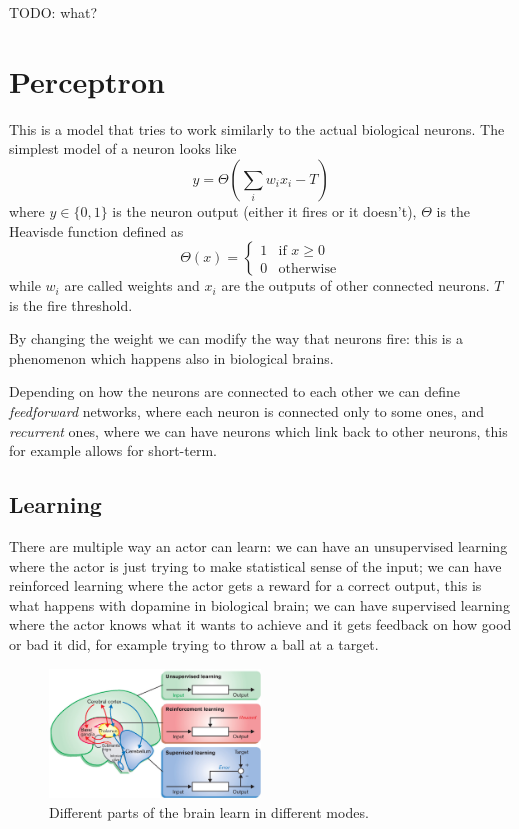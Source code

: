 \documentclass[12pt]{extarticle}
\begin{document}
TODO: what?

\section{Perceptron}

This is a model that tries to work similarly to the actual biological neurons.
The simplest model of a neuron looks like
\begin{equation}
	y = \Theta \left(\sum_i w_i x_i - T \right)
\end{equation}
where $y \in \{0, 1\}$ is the neuron output (either it fires or it doesn't),
$\Theta$ is the Heavisde function defined as
\begin{equation}
	\Theta(x) = \begin{cases}
		1 & \text{if } x \geq 0 \\
		0 & \text{otherwise}
	\end{cases}
\end{equation}
while $w_i$ are called weights and $x_i$ are the outputs of other connected neurons.
$T$ is the fire threshold.

By changing the weight we can modify the way that neurons fire: this is a phenomenon which happens
also in biological brains.

Depending on how the neurons are connected to each other we can define \emph{feedforward}
networks, where each neuron is connected only to some  ones, and \emph{recurrent} ones,
where we can have neurons which link back to other neurons, this for example allows for short-term.

\subsection{Learning}

There are multiple way an actor can learn: we can have an unsupervised learning where the actor
is just trying to make statistical sense of the input;
we can have reinforced learning where the actor gets a reward for a correct output, this is what
happens with dopamine in biological brain;
we can have supervised learning where the actor knows what it wants to achieve and it gets feedback
on how good or bad it did, for example trying to throw a ball at a target.

\begin{figure}[H]
	\centering
	\includegraphics[width=0.5\textwidth]{./assets/modelling-ml/brain-learning-types.jpg}
	\caption{Different parts of the brain learn in different modes.}
\end{figure}
\end{document}
